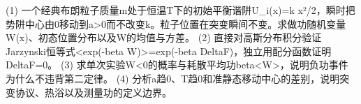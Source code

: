(1) 一个经典布朗粒子质量m处于恒温T下的初始平衡谐阱U_i(x)=k x²/2，瞬时把势阱中心由0移动到a>0而不改变k。粒子位置在突变瞬间不变。求做功随机变量W(x)、初态位置分布以及W的均值与方差。
(2) 直接对高斯分布积分验证Jarzynski恒等式<exp(-beta W)>=exp(-beta DeltaF)，独立用配分函数证明DeltaF=0。
(3) 求单次实验W<0的概率与耗散平均功beta<W>，说明负功事件为什么不违背第二定律。
(4) 分析a趋0、T趋0和准静态移动中心的差别，说明突变协议、热浴以及测量功的定义边界。
